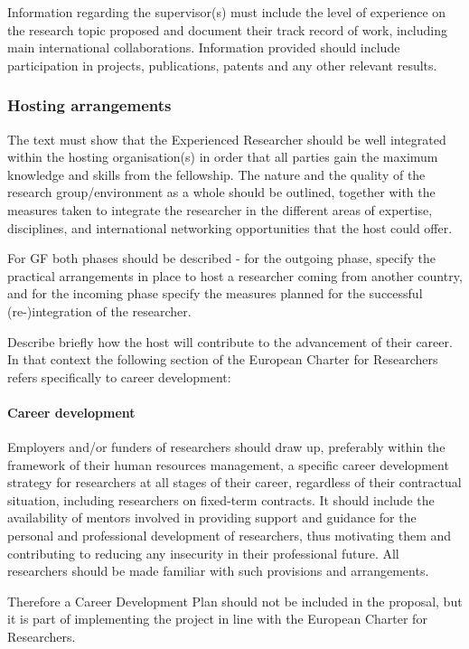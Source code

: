 \documentclass[a4paper,11pt]{article}
\begin{document}
Information regarding the supervisor(s) must include the level of experience on the research topic proposed and document their track record of work, including main international collaborations. Information provided should include participation in projects, publications, patents and any other relevant results.

\subsubsection*{Hosting arrangements}

The text must show that the Experienced Researcher should be well integrated within the hosting organisation(s) in order that all parties gain the maximum knowledge and skills from the fellowship. The nature and the quality of the research group/environment as a whole should be outlined, together with the measures taken to integrate the researcher in the different areas of expertise, disciplines, and international networking opportunities that the host could offer.

For GF both phases should be described - for the outgoing phase, specify the practical arrangements in place to host a researcher coming from another country, and for the incoming phase specify the measures planned for the successful (re-)integration of the researcher.

Describe briefly how the host will contribute to the advancement of their career.  In that context the following section of the European Charter for Researchers refers specifically to career development:

\paragraph{Career development}
Employers and/or funders of researchers should draw up, preferably within the framework of their human resources management, a specific career development strategy for researchers at all stages of their career, regardless of their contractual situation, including researchers on fixed-term contracts. It should include the availability of mentors involved in providing support and guidance for the personal and professional development of researchers, thus motivating them and contributing to reducing any insecurity in their professional future. All researchers should be made familiar with such provisions and arrangements. 

Therefore a Career Development Plan should not be included in the proposal, but it is part of implementing the project in line with the European Charter for Researchers.
\end{document}
